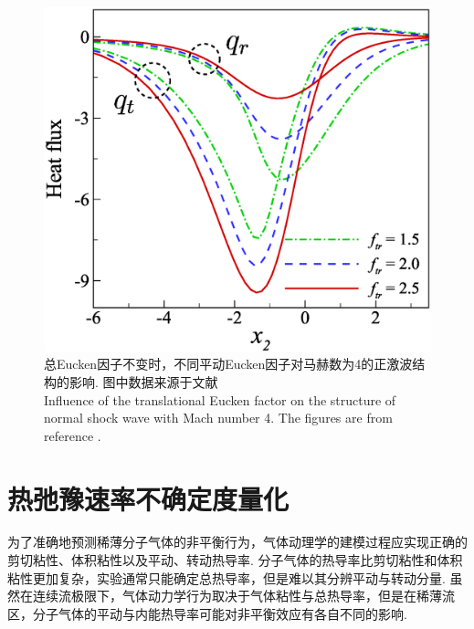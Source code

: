 \begin{figure}[!t]
	\includegraphics[scale=0.26,clip=true]{Fig/ShockWave_Q_vf}
	\caption{
		总Eucken因子不变时，不同平动Eucken因子对马赫数为4的正激波结构的影响. 图中数据来源于文献\cite{Li2021Uncertainty} \\
		Influence of the translational Eucken factor on the structure of normal shock wave with Mach number 4. The figures are from reference \cite{Li2021Uncertainty}.
	}
	\label{fig:shockwave_vary-f}
\end{figure}

\section{热弛豫速率不确定度量化}\label{sec:uncertainty}

为了准确地预测稀薄分子气体的非平衡行为，气体动理学的建模过程应实现正确的剪切粘性、体积粘性以及平动、转动热导率. 分子气体的热导率比剪切粘性和体积粘性更加复杂，实验通常只能确定总热导率，但是难以其分辨平动与转动分量. 虽然在连续流极限下，气体动力学行为取决于气体粘性与总热导率，但是在稀薄流区，分子气体的平动与内能热导率可能对非平衡效应有各自不同的影响. %








